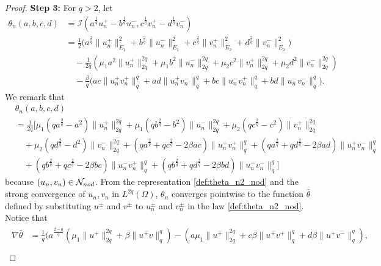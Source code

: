 \documentclass[10pt,a4paper]{amsart}
\numberwithin{equation}{section}
\begin{document}
\begin{proof}
\noindent\textbf{Step 3:} For $q>2$, let
\begin{equation} \label{def:theta_n_nod}
\begin{split}
  \theta_n(a,b,c,d)
&=  \mathcal I (a^{\frac{1}{q}}u_n^+-b^{\frac{1}{q}}u_n^-,c^{\frac{1}q}v_n^+
-d^{\frac{1}{q}}v_n^-)  \\
&= \frac{1}2 \Big( a^{\frac{2}q}\|u^+_n\|_{E_1}^2 + b^{\frac{2}q}\|u^-_n\|_{E_1}^2
  + c^{\frac{2}q}\|v_n^+\|_{E_2}^2 + d^{\frac{2}q}\|v_n^-\|_{E_2}^2 \Big)
  \\
&\quad - \frac{1}{2q} \left( \mu_1 a^2 \|u_n^+ \|_{2q}^{2q} +\mu_1 b^2 \|u_n^- \|_{2q}^{2q}
 + \mu_2 c^2\|v_n^+\|_{2q}^{2q} +\mu_2 d^2\|v_n^-\|_{2q}^{2q} \right)
  \\
&\quad -\frac{\beta}{q} \Big( ac \|u_n^+v_n^+\|_q^q +  ad \|u_n^+v_n^-\|_q^q
+ bc \|u_n^-v_n^+\|_q^q +  bd \|u_n^-v_n^-\|_q^q \Big) .
\end{split}
\end{equation}
We remark that
 \begin{equation} \label{def:theta_n2_nod}
\begin{split}
&\theta_n(a,b,c,d) \\
&= \frac{1}{2q} \Big[ \mu_1 (q  a^{\frac{2}q} \!-a^2) \|u_n^+\|_{2q}^{2q}
  + \mu_1 (q  b^{\frac{2}q} \!-b^2) \|u_n^-\|_{2q}^{2q}
  +\mu_2 (q  c^{\frac{2}q} \!-c^2) \|v_n^+\|_{2q}^{2q}  \\
&\quad + \mu_2 (q  d^{\frac{2}q} \!-d^2) \|v_n^-\|_{2q}^{2q}
  + ( q a^{\frac{2}q} +  qc^{\frac{2}q} - 2\beta ac)
   \|u_n^+v_n^+\|_q^q  + ( q a^{\frac{2}q} +  qd^{\frac{2}q} - 2\beta ad)
    \|u_n^+v_n^-\|_q^q \\
&\quad  + ( q b^{\frac{2}q} +  qc^{\frac{2}q} - 2\beta bc)  \|u_n^-v_n^+\|_q^q
  + ( q b^{\frac{2}q} +  qd^{\frac{2}q} - 2\beta bd)  \|u_n^-v_n^-\|_q^q \Big]
\end{split}
\end{equation}
because $(u_n,v_n)\in \mathcal N_{\rm nod}$.
From the representation \eqref{def:theta_n2_nod} and the strong convergence of
$u_n, v_n$ in $L^{2q}(\Omega)$, $\theta_n$ converges pointwise to the function
$\bar\theta$ defined by substituting $u^{\pm}$ and $v^{\pm}$ to $u^{\pm}_n$ and
$v^{\pm}_n$ in the law \eqref{def:theta_n2_nod}.
Notice that
\begin{gather*}
\begin{aligned}
\nabla\bar\theta
&= \frac{1}{q} \Big(
 a^{\frac{2-q}q}(\mu_1\|u^+\|_{2q}^{2q} +\beta\|u^+v\|_q^q)
 - ( a\mu_1\|u^+\|_{2q}^{2q} +c \beta \|u^+v^+\|_q^q +d\beta \|u^+v^-\|_q^q), \\

\end{aligned}
\end{gather*}
\end{proof}
\end{document}
